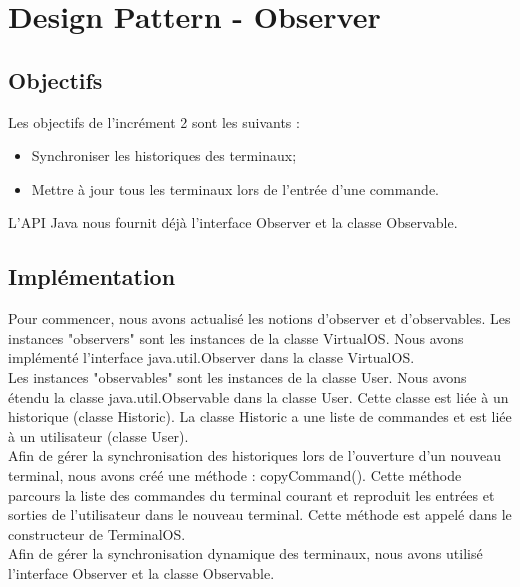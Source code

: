 
\newpage
\section{Design Pattern - Observer}

\subsection{Objectifs}

Les objectifs de l'incrément 2 sont les suivants :\\

\begin{itemize}
\item Synchroniser les historiques des terminaux;
\item Mettre à jour tous les terminaux lors de l'entrée d'une commande.\\
\end{itemize}

L'API Java nous fournit déjà l'interface Observer et la classe Observable.

\subsection{Implémentation}

Pour commencer, nous avons actualisé les notions d'observer et d'observables.
Les instances "observers" sont les instances de la classe VirtualOS. Nous avons implémenté l'interface java.util.Observer dans la classe VirtualOS.\\

Les instances "observables" sont les instances de la classe User. Nous avons étendu la classe java.util.Observable dans la classe User. Cette classe est liée à un historique (classe Historic). La classe Historic a une liste de commandes et est liée à un utilisateur (classe User).\\

Afin de gérer la synchronisation des historiques lors de l'ouverture d'un nouveau terminal, nous avons créé une méthode : copyCommand(). Cette méthode parcours la liste des commandes du terminal courant et reproduit les entrées et sorties de l'utilisateur dans le nouveau terminal. Cette méthode est appelé dans le constructeur de TerminalOS.\\

Afin de gérer la synchronisation dynamique des terminaux, nous avons utilisé l'interface Observer et la classe Observable.\\

